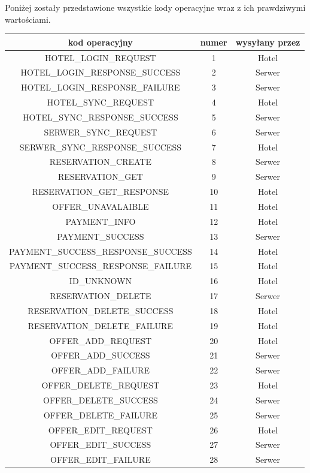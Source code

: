 \documentclass{article}
\begin{document}
Poniżej zostały przedstawione wszystkie kody operacyjne wraz z ich prawdziwymi wartościami.
\begin{center}
    \begin{tabular}{|c|c|c|}\hline
        kod operacyjny & numer & wysyłany przez\\ \hline \hline
        HOTEL\_LOGIN\_REQUEST & 1 & Hotel\\ \hline
        HOTEL\_LOGIN\_RESPONSE\_SUCCESS & 2 & Serwer\\ \hline
        HOTEL\_LOGIN\_RESPONSE\_FAILURE & 3 & Serwer\\ \hline
        HOTEL\_SYNC\_REQUEST & 4 & Hotel\\ \hline
        HOTEL\_SYNC\_RESPONSE\_SUCCESS & 5 & Serwer\\ \hline
        SERWER\_SYNC\_REQUEST & 6 & Serwer\\ \hline
        SERWER\_SYNC\_RESPONSE\_SUCCESS & 7 & Hotel\\ \hline
        RESERVATION\_CREATE & 8 & Serwer\\ \hline
        RESERVATION\_GET & 9 & Serwer\\ \hline
        RESERVATION\_GET\_RESPONSE & 10 & Hotel\\ \hline
        OFFER\_UNAVALAIBLE & 11 & Hotel\\ \hline
        PAYMENT\_INFO & 12 & Hotel\\ \hline
        PAYMENT\_SUCCESS & 13 & Serwer\\ \hline
        PAYMENT\_SUCCESS\_RESPONSE\_SUCCESS & 14 & Hotel\\ \hline
        PAYMENT\_SUCCESS\_RESPONSE\_FAILURE & 15 & Hotel\\ \hline
        ID\_UNKNOWN & 16 & Hotel\\ \hline
        RESERVATION\_DELETE & 17 & Serwer\\ \hline
        RESERVATION\_DELETE\_SUCCESS & 18 & Hotel\\ \hline
        RESERVATION\_DELETE\_FAILURE & 19 & Hotel\\ \hline
        OFFER\_ADD\_REQUEST & 20 & Hotel\\ \hline
        OFFER\_ADD\_SUCCESS & 21 & Serwer\\ \hline 
        OFFER\_ADD\_FAILURE & 22 & Serwer\\ \hline
        OFFER\_DELETE\_REQUEST & 23 & Hotel\\ \hline
        OFFER\_DELETE\_SUCCESS & 24 & Serwer\\ \hline 
        OFFER\_DELETE\_FAILURE & 25 & Serwer\\ \hline   
        OFFER\_EDIT\_REQUEST & 26 & Hotel\\ \hline
        OFFER\_EDIT\_SUCCESS & 27 & Serwer\\ \hline 
        OFFER\_EDIT\_FAILURE & 28 & Serwer\\ \hline
    \end{tabular}
\end{center}
\end{document}
